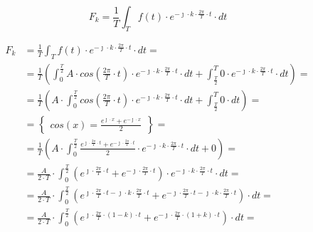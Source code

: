 \begin{task}




\begin{equation}
F_k=\frac{1}{T}\int_{T}f(t) \cdot e^{- \jmath \cdot k \cdot \frac{2\pi}{T} \cdot t} \cdot dt
\end{equation}


\begin{align*}
F_k&=\frac{1}{T}\int_{T}f(t) \cdot e^{-\jmath \cdot k \cdot \frac{2\pi}{T} \cdot t} \cdot dt=\\
&=\frac{1}{T}\left( \int_{0}^{\frac{T}{2}}A \cdot cos\left( \frac{2\pi}{T} \cdot t\right) \cdot e^{ - \jmath \cdot k \cdot \frac{2\pi}{T} \cdot t} \cdot dt + \int_{\frac{T}{2}}^{T} 0 \cdot e^{ - \jmath \cdot k \cdot \frac{2\pi}{T} \cdot t} \cdot dt\right)=\\
&=\frac{1}{T}\left( A \cdot  \int_{0}^{\frac{T}{2}}cos\left( \frac{2\pi}{T} \cdot t\right) \cdot e^{ -\jmath \cdot k \cdot \frac{2\pi}{T} \cdot t} \cdot dt + \int_{\frac{T}{2}}^{T} 0 \cdot dt\right)=\\
&=\begin{Bmatrix}
cos\left(x\right) = \frac{e^{\jmath \cdot x}+e^{-\jmath \cdot x}}{2}
\end{Bmatrix}=\\
&=\frac{1}{T}\left( A \cdot  \int_{0}^{\frac{T}{2}} \frac{e^{\jmath \cdot \frac{2\pi}{T} \cdot t}+e^{-\jmath \cdot \frac{2\pi}{T} \cdot t}}{2} \cdot e^{ - \jmath \cdot k \cdot \frac{2\pi}{T} \cdot t} \cdot dt + 0\right)=\\
&=\frac{A}{2\cdot T}\cdot  \int_{0}^{\frac{T}{2}} \left(e^{\jmath \cdot \frac{2\pi}{T} \cdot t}+e^{-\jmath \cdot \frac{2\pi}{T} \cdot t}\right) \cdot e^{- \jmath \cdot k \cdot \frac{2\pi}{T} \cdot t} \cdot dt =\\
&=\frac{A}{2\cdot T}\cdot  \int_{0}^{\frac{T}{2}} \left(e^{\jmath \cdot \frac{2\pi}{T} \cdot t - \jmath \cdot k \cdot \frac{2\pi}{T} \cdot t}+e^{-\jmath \cdot \frac{2\pi}{T} \cdot t - \jmath \cdot k \cdot \frac{2\pi}{T} \cdot t}\right) \cdot dt =\\
&=\frac{A}{2\cdot T}\cdot  \int_{0}^{\frac{T}{2}} \left(e^{\jmath \cdot \frac{2\pi}{T} \cdot \left(1 -k\right) \cdot t}+e^{-\jmath \cdot \frac{2\pi}{T} \cdot \left(1+k\right)\cdot t }\right) \cdot dt =\\

\end{align*}
\end{task}
